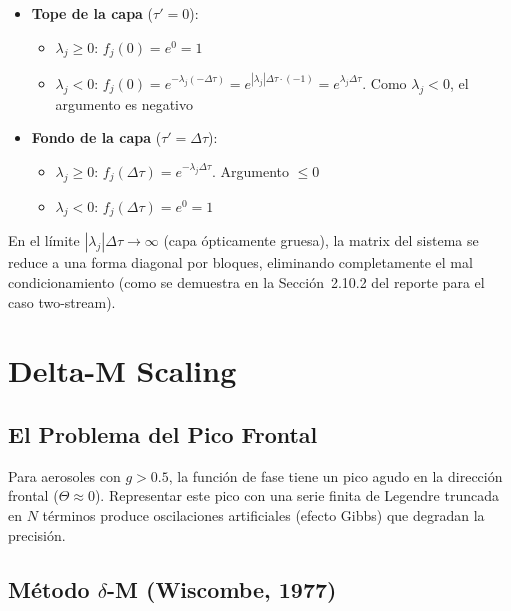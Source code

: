 \documentclass[a4paper,11pt]{article}
\begin{document}
\begin{itemize}
    \item \textbf{Tope de la capa} ($\tau'=0$):
    \begin{itemize}
        \item $\lambda_j \geq 0$: $f_j(0) = e^0 = 1$ \checkmark
        \item $\lambda_j < 0$: $f_j(0) = e^{-\lambda_j(-\Delta\tau)} = e^{|\lambda_j|\Delta\tau \cdot (-1)} = e^{\lambda_j\Delta\tau}$. Como $\lambda_j < 0$, el argumento es negativo \checkmark
    \end{itemize}
    \item \textbf{Fondo de la capa} ($\tau'=\Delta\tau$):
    \begin{itemize}
        \item $\lambda_j \geq 0$: $f_j(\Delta\tau) = e^{-\lambda_j\Delta\tau}$. Argumento $\leq 0$ \checkmark
        \item $\lambda_j < 0$: $f_j(\Delta\tau) = e^0 = 1$ \checkmark
    \end{itemize}
\end{itemize}

En el l\'imite $|\lambda_j|\Delta\tau \to \infty$ (capa \'opticamente gruesa),
la matrix del sistema se reduce a una forma diagonal por bloques, eliminando
completamente el mal condicionamiento (como se demuestra en la Secci\'on~2.10.2
del reporte para el caso two-stream).


\section{Delta-M Scaling}\label{sec:deltam}

\subsection{El Problema del Pico Frontal}

Para aerosoles con $g > 0.5$, la funci\'on de fase tiene un pico agudo en la
direcci\'on frontal ($\Theta \approx 0$).  Representar este pico con una serie
finita de Legendre truncada en $N$ t\'erminos produce oscilaciones artificiales
(efecto Gibbs) que degradan la precisi\'on.

\subsection{M\'etodo $\delta$-M (Wiscombe, 1977)}
\end{document}
